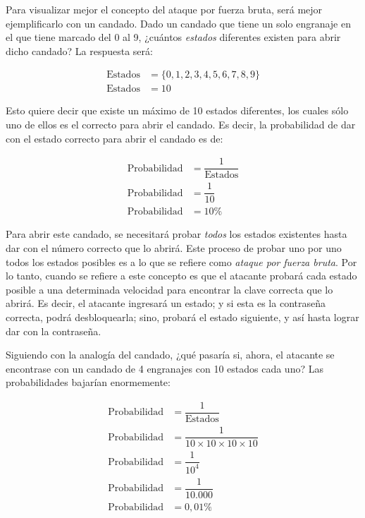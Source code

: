 \documentclass[12pt,a4paper,twoside]{book}
\begin{document}
Para visualizar mejor el concepto del ataque por fuerza bruta, será mejor ejemplificarlo con un candado. Dado un candado que tiene un solo engranaje en el que tiene marcado del 0 al 9, ¿cuántos \textit{estados} diferentes existen para abrir dicho candado? La respuesta será:

\begin{align*}
\text{Estados} &= \lbrace 0, 1, 2, 3, 4, 5, 6, 7, 8, 9 \rbrace \\
\text{Estados} &= 10
\end{align*}

Esto quiere decir que existe un máximo de 10 estados diferentes, los cuales sólo uno de ellos es el correcto para abrir el candado. Es decir, la probabilidad de dar con el estado correcto para abrir el candado es de:

\begin{align*}
\text{Probabilidad} &= \dfrac{1}{\text{Estados}} \\
\text{Probabilidad} &= \dfrac{1}{10} \\
\text{Probabilidad} &= 10 \%
\end{align*}

Para abrir este candado, se necesitará probar \textit{todos} los estados existentes hasta dar con el número correcto que lo abrirá. Este proceso de probar uno por uno todos los estados posibles es a lo que se refiere como \textit{ataque por fuerza bruta}. Por lo tanto, cuando se refiere a este concepto es que el atacante probará cada estado posible a una determinada velocidad para encontrar la clave correcta que lo abrirá. Es decir, el atacante ingresará un estado; y si esta es la contraseña correcta, podrá desbloquearla; sino, probará el estado siguiente, y así hasta lograr dar con la contraseña.

Siguiendo con la analogía del candado, ¿qué pasaría si, ahora, el atacante se encontrase con un candado de 4 engranajes con 10 estados cada uno? Las probabilidades bajarían enormemente:

\begin{align*}
\text{Probabilidad} &= \dfrac{1}{\text{Estados}} \\
\text{Probabilidad} &= \dfrac{1}{10 \times 10 \times 10 \times 10} \\
\text{Probabilidad} &= \dfrac{1}{10^{4}} \\
\text{Probabilidad} &= \dfrac{1}{10.000} \\
\text{Probabilidad} &= 0,01 \%
\end{align*}
\end{document}
